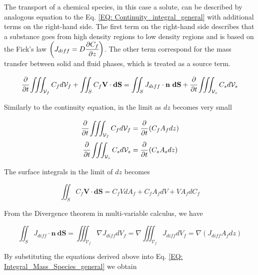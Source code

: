 \documentclass[../Article_Model_Parameters.tex]{subfiles}
\begin{document}
	The transport of a chemical species, in this case a solute, can be described by analogous equation to the Eq. \ref{EQ: Continuity_integral_general} with additional terms on the right-hand side. The first term on the right-hand side describes that a substance goes from high density regions to low density regions and is based on the Fick's law ${\footnotesize\left( J_{diff} = D\cfrac{\partial C_f}{\partial z} \right)}$. The other term correspond for the mass transfer between solid and fluid phases, which is treated as a source term.
	
	{\footnotesize
		\begin{equation}
			\cfrac{\partial}{\partial t} \iiint_{\mathcal{V}_f} C_f d\mathcal{V}_f + \iint_S C_f \textbf{V} \cdot \textbf{dS} = \iint_S J_{diff} \cdot \textbf{n}~\textbf{dS} + \cfrac{\partial}{\partial t} \iiint_{\mathcal{V}_s} C_s d\mathcal{V}_s
			\label{EQ: Integral_Mass_Species_general}
		\end{equation}
	}
	
	Similarly to the continuity equation, in the limit as $dz$ becomes very small
	
	{\footnotesize
		\begin{align}
			\cfrac{\partial}{\partial t} \iiint_{\mathcal{V}_f} C_f d\mathcal{V}_f &= \cfrac{\partial}{\partial t}\left( C_f A_f dz \right) \\
			\cfrac{\partial}{\partial t} \iiint_{\mathcal{V}_s} C_s d\mathcal{V}_s &= \cfrac{\partial}{\partial t}\left( C_s A_s dz \right)
		\end{align}
	}

	The surface integrals in the limit of $dz$ becomes
	
	{\footnotesize
		\begin{equation}
			\iint_S C_f \textbf{V} \cdot \textbf{dS} = C_f V dA_f + C_f A_f dV + V A_f dC_f 
		\end{equation}
	}
	
	From the Divergence theorem in multi-variable calculus, we have
	
	{\footnotesize
		\begin{equation}
			\iint_S J_{diff} \cdot \textbf{n}~\textbf{dS} = \iiint_{\mathcal{V}_f} \nabla J_{diff} dV_f = \nabla \iiint_{\mathcal{V}_f} J_{diff} dV_f = \nabla \left( J_{diff} A_f dz \right)
		\end{equation}
	}
	
	By substituting the equations derived above into Eq. \ref{EQ: Integral_Mass_Species_general} we obtain
	
\end{document}
